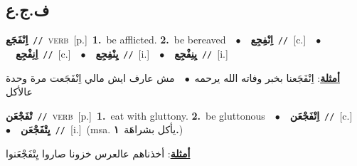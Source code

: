 \documentclass[10pt,a4paper,twoside]{article} %
\begin{document}
\begin{multicols}{2}
\vspace{-3mm}
\subsection*{\color{blue}\foreignlanguage{arabic}{ف.ج.ع}\color{blue}{}} 

{\setlength\topsep{0pt}\textbf{\foreignlanguage{arabic}{اِنْفَجَع}}\ {\color{gray}\texttt{//}\color{black}}\ \textsc{verb}\ [p.]\ \textbf{1.}~be afflicted.  \textbf{2.}~be bereaved\ \ $\bullet$\ \ \setlength\topsep{0pt}\textbf{\foreignlanguage{arabic}{اِنْفِجِع}}\ {\color{gray}\texttt{//}\color{black}}\ [c.]\ \ $\bullet$\ \ \setlength\topsep{0pt}\textbf{\foreignlanguage{arabic}{اِنِفْجِع}}\ {\color{gray}\texttt{//}\color{black}}\ [c.]\ \ $\bullet$\ \ \setlength\topsep{0pt}\textbf{\foreignlanguage{arabic}{يِنْفِجِع}}\ {\color{gray}\texttt{//}\color{black}}\ [i.]\ \ $\bullet$\ \ \setlength\topsep{0pt}\textbf{\foreignlanguage{arabic}{يِنِفْجِع}}\ {\color{gray}\texttt{//}\color{black}}\ [i.]\  \begin{flushright}\color{gray}\foreignlanguage{arabic}{\textbf{\underline{\foreignlanguage{arabic}{أمثلة}}}: اِنْفَجَعنا بخبر وفاته الله يرحمه\ $\bullet$\ \  مش عارف ايش مالي اِنْفَجَعت مرة وحدة عالأكل}\end{flushright}\color{black}} \vspace{2mm}

{\setlength\topsep{0pt}\textbf{\foreignlanguage{arabic}{تْفَجْعَن}}\ {\color{gray}\texttt{//}\color{black}}\ \textsc{verb}\ [p.]\ \textbf{1.}~eat with gluttony.  \textbf{2.}~be gluttonous\ \ $\bullet$\ \ \setlength\topsep{0pt}\textbf{\foreignlanguage{arabic}{اِتْفَجْعَن}}\ {\color{gray}\texttt{//}\color{black}}\ [c.]\ \ $\bullet$\ \ \setlength\topsep{0pt}\textbf{\foreignlanguage{arabic}{يِتْفَجْعَن}}\ {\color{gray}\texttt{//}\color{black}}\ [i.]\ \color{gray}(msa. \foreignlanguage{arabic}{يأكل بشراهَة}~\foreignlanguage{arabic}{\textbf{١.}})\color{black}\  \begin{flushright}\color{gray}\foreignlanguage{arabic}{\textbf{\underline{\foreignlanguage{arabic}{أمثلة}}}: أخذناهم عالعرس خزونا صاروا يِتْفَجْعَنوا}\end{flushright}\color{black}} \vspace{2mm}


\end{multicols}
\end{document}
